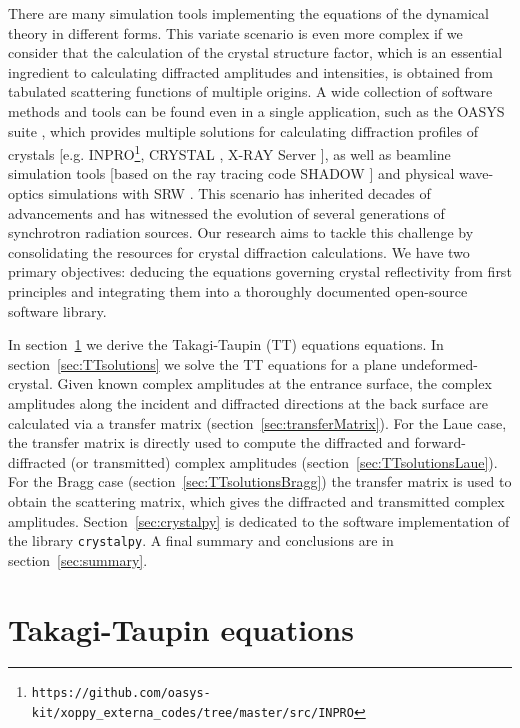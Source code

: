 \documentclass{iucr}
\begin{document}
There are many simulation tools implementing the equations of the dynamical theory in different forms. This variate scenario is even more complex if we consider that the calculation of the crystal structure factor, which is an essential ingredient to calculating diffracted amplitudes and intensities, is obtained from tabulated scattering functions of multiple origins. A wide collection of software methods and tools can be found even in a single application, such as the OASYS suite \cite{codeOASYS}, which provides multiple solutions for calculating diffraction profiles of crystals [e.g. INPRO\footnote{\texttt{https://github.com/oasys-kit/xoppy\_externa\_codes/tree/master/src/INPRO}}, CRYSTAL \cite{codeCRYSTAL}, X-RAY Server \cite{codeXRAYserver}], as well as beamline simulation tools [based on the ray tracing code SHADOW \cite{codeSHADOW}] and physical wave-optics simulations with SRW \cite{codeSRW, codeSRWcrystals}.
This scenario has inherited decades of advancements and has witnessed the evolution of several generations of synchrotron radiation sources.
Our research aims to tackle this challenge by consolidating the resources for crystal diffraction calculations. We have two primary objectives: deducing the equations governing crystal reflectivity from first principles and integrating them into a thoroughly documented open-source software library.

In section~\ref{sec:TT} we derive the Takagi-Taupin (TT) equations \cite{Takagi1962, Taupin, Taupin1967} equations.
In section~\ref{sec:TTsolutions} we solve the TT equations for a plane undeformed-crystal.
Given known complex amplitudes at the entrance surface, the complex amplitudes along the incident and diffracted directions at the back surface are calculated via a transfer matrix (section~\ref{sec:transferMatrix}). For the Laue case, the transfer matrix is directly used to compute the diffracted and forward-diffracted (or transmitted) complex amplitudes (section~\ref{sec:TTsolutionsLaue}). For the Bragg case (section~\ref{sec:TTsolutionsBragg}) the transfer matrix is used to obtain the scattering matrix, which gives the diffracted and transmitted complex  amplitudes. 
Section~\ref{sec:crystalpy} is dedicated to the software implementation of the library \texttt{crystalpy}. A final summary and conclusions are in section~\ref{sec:summary}.
 
%
\section{Takagi-Taupin equations}
\label{sec:TT}
\end{document}
